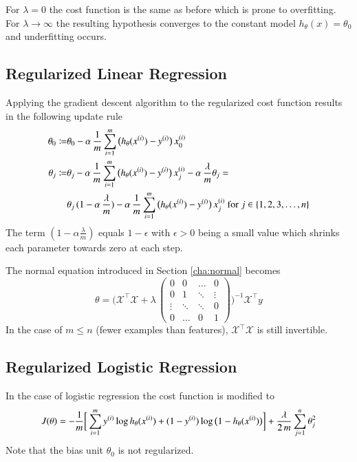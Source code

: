 \documentclass[a4paper,twoside,10pt]{article}
\begin{document}
For $\lambda=0$ the cost function is the same as before which is prone to overfitting. For $\lambda\rightarrow\infty$ the resulting hypothesis converges to the constant model $h_\theta(x)=\theta_0$ and underfitting occurs.

\subsection{Regularized Linear Regression}
Applying the gradient descent algorithm to the regularized cost function results in the following update rule
\begin{align*}
  \begin{split}
    \theta_0\coloneqq&\theta_0-\alpha\,\frac{1}{m}\displaystyle\sum_{i=1}^m\big(h_\theta(x^{(i)})-y^{(i)}\big)\,x^{(i)}_0\\
    \theta_j\coloneqq&\theta_j-\alpha\,\frac{1}{m}\displaystyle\sum_{i=1}^m\big(h_\theta(x^{(i)})-y^{(i)}\big)\,x^{(i)}_j-\alpha\,\frac{\lambda}{m}\theta_j=\\
    &\theta_j\,(1-\alpha\,\frac{\lambda}{m})-\alpha\,\frac{1}{m}\displaystyle\sum_{i=1}^m\big(h_\theta(x^{(i)})-y^{(i)}\big)\,x^{(i)}_j
    \mathrm{\ for\ }j\in\{1,2,3,\ldots,n\}
  \end{split}
\end{align*}
The term $(1-\alpha\frac{\lambda}{m})$ equals $1-\epsilon$ with $\epsilon>0$ being a small value which shrinks each parameter towards zero at each step.

The normal equation introduced in Section \ref{cha:normal} becomes
\begin{equation*}
  \theta=\Bigg(\mathcal{X}^\top\mathcal{X}+\lambda\,
\begin{pmatrix}
  0&0&\hdots&0\\
  0&1&\ddots&\vdots\\
  \vdots&\ddots&\ddots&0\\
  0&\hdots&0&1
\end{pmatrix}\Bigg)^{-1}\mathcal{X}^\top y
\end{equation*}
In the case of $m\le n$ (fewer examples than features), $\mathcal{X}^\top\mathcal{X}$ is still invertible.

\subsection{Regularized Logistic Regression}\label{cha:regreg}
In the case of logistic regression the cost function is modified to
\begin{equation*}
  J(\theta)=-\frac{1}{m}\bigg[\displaystyle\sum_{i=1}^my^{(i)}\operatorname{log}h_\theta(x^{(i)})+(1-y^{(i)})\operatorname{log}\big(1-h_\theta(x^{(i)})\big)\bigg]+
  \frac{\lambda}{2\,m}\sum_{j=1}^n\theta_j^2
\end{equation*}
Note that the bias unit $\theta_0$ is not regularized.
\end{document}
